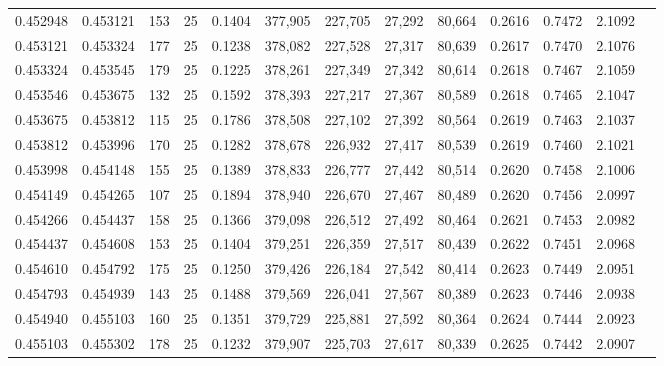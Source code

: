 \begin{tabular}{rrrrrrrrrrrrr}
0.452948 & 0.453121 &   153 &  25 &                                     0.1404 & 377,905 & 227,705 &  27,292 &  80,664 & 0.2616 & 0.7472 & 2.1092 \\
0.453121 & 0.453324 &   177 &  25 &                                     0.1238 & 378,082 & 227,528 &  27,317 &  80,639 & 0.2617 & 0.7470 & 2.1076 \\
0.453324 & 0.453545 &   179 &  25 &                                     0.1225 & 378,261 & 227,349 &  27,342 &  80,614 & 0.2618 & 0.7467 & 2.1059 \\
0.453546 & 0.453675 &   132 &  25 &                                     0.1592 & 378,393 & 227,217 &  27,367 &  80,589 & 0.2618 & 0.7465 & 2.1047 \\
0.453675 & 0.453812 &   115 &  25 &                                     0.1786 & 378,508 & 227,102 &  27,392 &  80,564 & 0.2619 & 0.7463 & 2.1037 \\
0.453812 & 0.453996 &   170 &  25 &                                     0.1282 & 378,678 & 226,932 &  27,417 &  80,539 & 0.2619 & 0.7460 & 2.1021 \\
0.453998 & 0.454148 &   155 &  25 &                                     0.1389 & 378,833 & 226,777 &  27,442 &  80,514 & 0.2620 & 0.7458 & 2.1006 \\
0.454149 & 0.454265 &   107 &  25 &                                     0.1894 & 378,940 & 226,670 &  27,467 &  80,489 & 0.2620 & 0.7456 & 2.0997 \\
0.454266 & 0.454437 &   158 &  25 &                                     0.1366 & 379,098 & 226,512 &  27,492 &  80,464 & 0.2621 & 0.7453 & 2.0982 \\
0.454437 & 0.454608 &   153 &  25 &                                     0.1404 & 379,251 & 226,359 &  27,517 &  80,439 & 0.2622 & 0.7451 & 2.0968 \\
0.454610 & 0.454792 &   175 &  25 &                                     0.1250 & 379,426 & 226,184 &  27,542 &  80,414 & 0.2623 & 0.7449 & 2.0951 \\
0.454793 & 0.454939 &   143 &  25 &                                     0.1488 & 379,569 & 226,041 &  27,567 &  80,389 & 0.2623 & 0.7446 & 2.0938 \\
0.454940 & 0.455103 &   160 &  25 &                                     0.1351 & 379,729 & 225,881 &  27,592 &  80,364 & 0.2624 & 0.7444 & 2.0923 \\
0.455103 & 0.455302 &   178 &  25 &                                     0.1232 & 379,907 & 225,703 &  27,617 &  80,339 & 0.2625 & 0.7442 & 2.0907 \\

\end{tabular}
